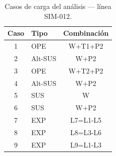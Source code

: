 \begin{table}[htbp]
  \centering
  \small
  \caption{Casos de carga del análisis — línea SIM-012.}
  \label{tab:casos}
  \begin{tabular}{clc}
    \toprule
    Caso & Tipo & Combinaci\'on \\
    \midrule
    1 & OPE & W+T1+P2 \\
    2 & Alt-SUS & W+P2 \\
    3 & OPE & W+T2+P2 \\
    4 & Alt-SUS & W+P2 \\
    5 & SUS & W \\
    6 & SUS & W+P2 \\
    7 & EXP & L7=L1-L5 \\
    8 & EXP & L8=L3-L6 \\
    9 & EXP & L9=L1-L3 \\
    \bottomrule
  \end{tabular}
\end{table}
